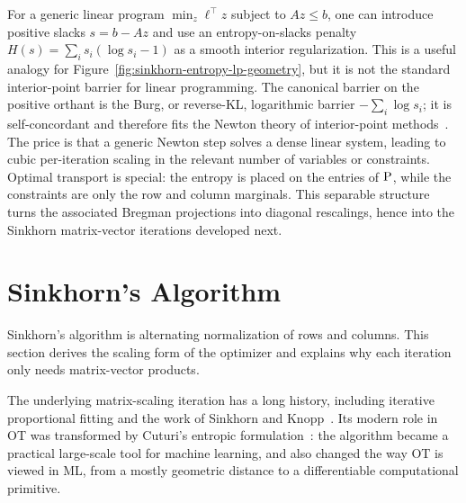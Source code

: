 \begin{rem}\label{rem-entropy-versus-lp-barriers}
For a generic linear program $\min_z \ell^\top z$ subject to $Az\leq b$, one can introduce positive slacks $s=b-Az$ and use an entropy-on-slacks penalty $H(s)=\sum_i s_i(\log s_i-1)$ as a smooth interior regularization. This is a useful analogy for Figure~\ref{fig:sinkhorn-entropy-lp-geometry}, but it is not the standard interior-point barrier for linear programming. The canonical barrier on the positive orthant is the Burg, or reverse-KL, logarithmic barrier $-\sum_i\log s_i$; it is self-concordant and therefore fits the Newton theory of interior-point methods~\cite{nesterov1994interior}. The price is that a generic Newton step solves a dense linear system, leading to cubic per-iteration scaling in the relevant number of variables or constraints. Optimal transport is special: the entropy is placed on the entries of $\P$, while the constraints are only the row and column marginals. This separable structure turns the associated Bregman projections into diagonal rescalings, hence into the Sinkhorn matrix-vector iterations developed next.
\end{rem}



\section{Sinkhorn's Algorithm}


Sinkhorn's algorithm is alternating normalization of rows and columns. This section derives the scaling form of the optimizer and explains why each iteration only needs matrix-vector products.

The underlying matrix-scaling iteration has a long history, including iterative proportional fitting and the work of Sinkhorn and Knopp~\cite{Sinkhorn64,SinkhornKnopp67,Sinkhorn67}. Its modern role in OT was transformed by Cuturi's entropic formulation~\cite{CuturiSinkhorn}: the algorithm became a practical large-scale tool for machine learning, and also changed the way OT is viewed in ML, from a mostly geometric distance to a differentiable computational primitive.

